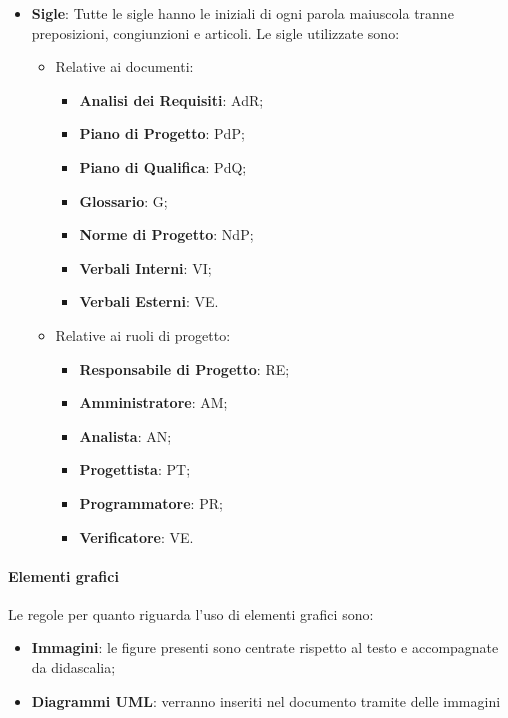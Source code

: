 \begin{itemize}
\item \textbf{Sigle}: Tutte le sigle hanno le iniziali di ogni parola maiuscola tranne preposizioni, congiunzioni e articoli. Le sigle utilizzate sono:
    \begin{itemize}
    \item Relative ai documenti:
        \begin{itemize}
        \item \textbf{Analisi dei Requisiti}: AdR;
        \item \textbf{Piano di Progetto}: PdP;
        \item \textbf{Piano di Qualifica}: PdQ;
        \item \textbf{Glossario}: G;
        \item \textbf{Norme di Progetto}: NdP;
        \item \textbf{Verbali Interni}: VI;
        \item \textbf{Verbali Esterni}: VE.
        \end{itemize}
    
    \item Relative ai ruoli di progetto:
        \begin{itemize}
        \item \textbf{Responsabile di Progetto}: RE;
        \item \textbf{Amministratore}: AM;
        \item \textbf{Analista}: AN;
        \item \textbf{Progettista}: PT;
        \item \textbf{Programmatore}: PR;
        \item \textbf{Verificatore}: VE.
        \end{itemize}
    \end{itemize}
\end{itemize}

\paragraph{Elementi grafici}
Le regole per quanto riguarda l’uso di elementi grafici sono:
\begin{itemize}
\item \textbf{Immagini}: le figure presenti sono centrate rispetto al testo e accompagnate da didascalia;
\item \textbf{Diagrammi UML}: verranno inseriti nel documento tramite delle immagini
\end{itemize}

